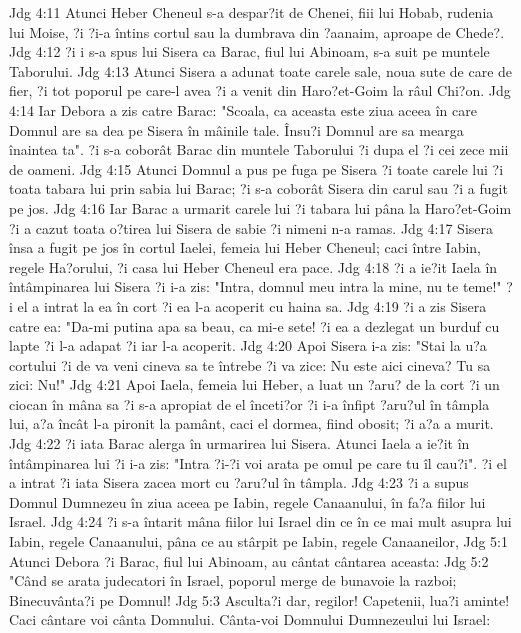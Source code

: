 Jdg 4:11  Atunci Heber Cheneul s-a despar?it de Chenei, fiii lui Hobab, rudenia lui Moise, ?i ?i-a întins cortul sau la dumbrava din ?aanaim, aproape de Chede?.
Jdg 4:12  ?i i s-a spus lui Sisera ca Barac, fiul lui Abinoam, s-a suit pe muntele Taborului.
Jdg 4:13  Atunci Sisera a adunat toate carele sale, noua sute de care de fier, ?i tot poporul pe care-l avea ?i a venit din Haro?et-Goim la râul Chi?on.
Jdg 4:14  Iar Debora a zis catre Barac: "Scoala, ca aceasta este ziua aceea în care Domnul are sa dea pe Sisera în mâinile tale. Însu?i Domnul are sa mearga înaintea ta". ?i s-a coborât Barac din muntele Taborului ?i dupa el ?i cei zece mii de oameni.
Jdg 4:15  Atunci Domnul a pus pe fuga pe Sisera ?i toate carele lui ?i toata tabara lui prin sabia lui Barac; ?i s-a coborât Sisera din carul sau ?i a fugit pe jos.
Jdg 4:16  Iar Barac a urmarit carele lui ?i tabara lui pâna la Haro?et-Goim ?i a cazut toata o?tirea lui Sisera de sabie ?i nimeni n-a ramas.
Jdg 4:17  Sisera însa a fugit pe jos în cortul Iaelei, femeia lui Heber Cheneul; caci între Iabin, regele Ha?orului, ?i casa lui Heber Cheneul era pace.
Jdg 4:18  ?i a ie?it Iaela în întâmpinarea lui Sisera ?i i-a zis: "Intra, domnul meu intra la mine, nu te teme!" ?i el a intrat la ea în cort ?i ea l-a acoperit cu haina sa.
Jdg 4:19  ?i a zis Sisera catre ea: "Da-mi putina apa sa beau, ca mi-e sete! ?i ea a dezlegat un burduf cu lapte ?i l-a adapat ?i iar l-a acoperit.
Jdg 4:20  Apoi Sisera i-a zis: "Stai la u?a cortului ?i de va veni cineva sa te întrebe ?i va zice: Nu este aici cineva? Tu sa zici: Nu!"
Jdg 4:21  Apoi Iaela, femeia lui Heber, a luat un ?aru? de la cort ?i un ciocan în mâna sa ?i s-a apropiat de el înceti?or ?i i-a înfipt ?aru?ul în tâmpla lui, a?a încât l-a pironit la pamânt, caci el dormea, fiind obosit; ?i a?a a murit.
Jdg 4:22  ?i iata Barac alerga în urmarirea lui Sisera. Atunci Iaela a ie?it în întâmpinarea lui ?i i-a zis: "Intra ?i-?i voi arata pe omul pe care tu îl cau?i". ?i el a intrat ?i iata Sisera zacea mort cu ?aru?ul în tâmpla.
Jdg 4:23  ?i a supus Domnul Dumnezeu în ziua aceea pe Iabin, regele Canaanului, în fa?a fiilor lui Israel.
Jdg 4:24  ?i s-a întarit mâna fiilor lui Israel din ce în ce mai mult asupra lui Iabin, regele Canaanului, pâna ce au stârpit pe Iabin, regele Canaaneilor,
Jdg 5:1  Atunci Debora ?i Barac, fiul lui Abinoam, au cântat cântarea aceasta:
Jdg 5:2  "Când se arata judecatori în Israel, poporul merge de bunavoie la razboi; Binecuvânta?i pe Domnul!
Jdg 5:3  Asculta?i dar, regilor! Capetenii, lua?i aminte! Caci cântare voi cânta Domnului. Cânta-voi Domnului Dumnezeului lui Israel:

